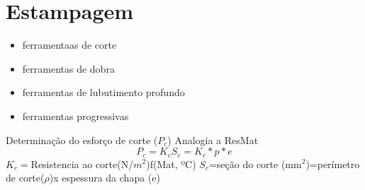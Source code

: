 \section{Estampagem}

\begin{itemize}
\item ferramentaas de corte
\item ferramentas de dobra
\item ferramentas de lubutimento profundo
\item ferramentas progressivas
\end{itemize}







Determinação do esforço de corte ($P_{c}$)
Analogia a ResMat
\[P_{c}=K_{c}S_{c}=K_{c}*p*e\]
$K_{c}=$Resistencia ao corte(N/$m^{2}$)f(Mat, ºC)
$S_{c}$=seção do corte (mm$^{2}$)=perímetro de corte($\rho$)x espessura da chapa (e)




